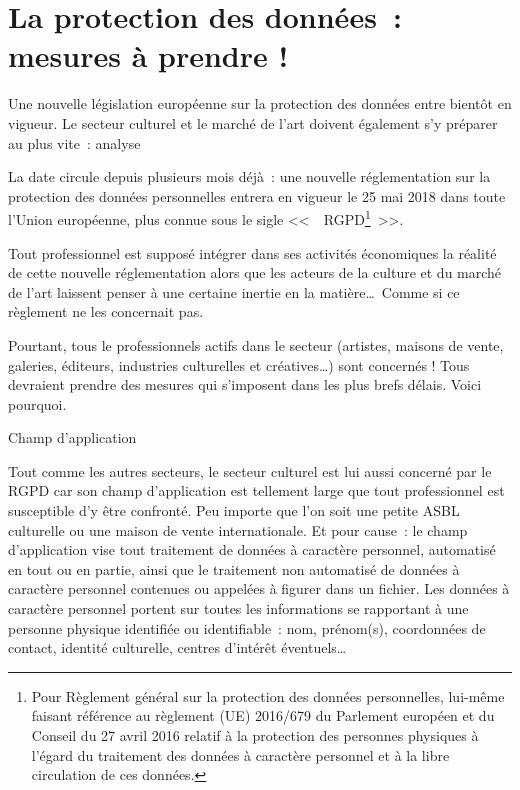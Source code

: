 \documentclass[11pt, french]{article}
\begin{document}
\vfill

\section{La protection des données~: mesures à prendre !}

Une nouvelle législation européenne sur la protection des données
entre bientôt en vigueur. Le secteur culturel et le marché de l'art
doivent également s'y préparer au plus vite~: analyse

La date circule depuis plusieurs mois déjà~: une nouvelle
réglementation sur la protection des données personnelles entrera en
vigueur le 25 mai 2018 dans toute l'Union européenne, plus connue sous
le sigle <<~~RGPD\footnote{Pour Règlement général sur la protection des
  données personnelles, lui-même faisant référence au règlement (UE)
  2016/679 du Parlement européen et du Conseil du 27 avril 2016
  relatif à la protection des personnes physiques à l'égard du
  traitement des données à caractère personnel et à la libre
  circulation de ces données.}~>>.

Tout professionnel est supposé intégrer dans ses activités économiques
la réalité de cette nouvelle réglementation alors que les acteurs de
la culture et du marché de l'art laissent penser à une certaine
inertie en la matière\ldots\ Comme si ce règlement ne les concernait
pas.

Pourtant, tous le professionnels actifs dans le secteur (artistes,
maisons de vente, galeries, éditeurs, industries culturelles et
créatives\ldots) sont concernés ! Tous devraient prendre des mesures
qui s'imposent dans les plus brefs délais. Voici pourquoi.

Champ d'application

Tout comme les autres secteurs, le secteur culturel est lui aussi
concerné par le RGPD car son champ d'application est tellement large
que tout professionnel est susceptible d'y être confronté. Peu importe
que l'on soit une petite ASBL culturelle ou une maison de vente
internationale. Et pour cause~: le champ d'application vise tout
traitement de données à caractère personnel, automatisé en tout ou en
partie, ainsi que le traitement non automatisé de données à caractère
personnel contenues ou appelées à figurer dans un fichier. Les données
à caractère personnel portent sur toutes les informations se
rapportant à une personne physique identifiée ou identifiable~: nom,
prénom(s), coordonnées de contact, identité culturelle, centres
d'intérêt éventuels\ldots
\end{document}
